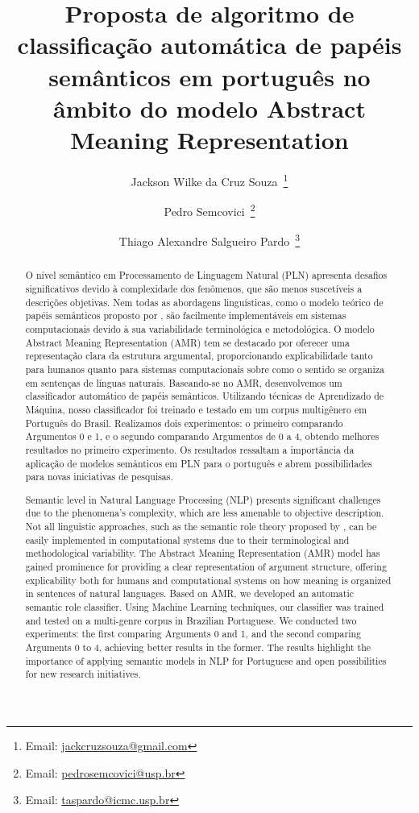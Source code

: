 \documentclass[portuguese]{textolivre}
\title{Proposta de algoritmo de classificação automática de papéis semânticos em português no âmbito do modelo Abstract Meaning Representation}
\author[1]{Jackson Wilke da Cruz Souza~\orcid{0000-0003-1881-6780}\thanks{Email: \href{mailto:jackcruzsouza@gmail.com}{jackcruzsouza@gmail.com}}}
\author[2]{Pedro Semcovici~\orcid{0009-0008-8455-8509 }\thanks{Email: \href{mailto:pedrosemcovici@usp.br}{pedrosemcovici@usp.br}}}
\author[2]{Thiago Alexandre Salgueiro Pardo~\orcid{0000-0003-2111-1319 }\thanks{Email: \href{mailto:taspardo@icmc.usp.br}{taspardo@icmc.usp.br}}}
\affil[1]{Universidade Federal da Bahia,Instituto de Ciência, Tecnologia e Inovação, Camaçari, BA, Brasil.}
\affil[2]{Universidade de São Paulo, Escola de Artes, Ciências e Humanidades, São Paulo, SP, Brasil.}
\begin{document}
\maketitle
\begin{polyabstract}
\begin{abstract}
  O nível semântico em Processamento de Linguagem Natural (PLN) apresenta desafios significativos devido à complexidade dos fenômenos, que são menos suscetíveis a descrições objetivas. Nem todas as abordagens linguísticas, como o modelo teórico de papéis semânticos proposto por \textcite{cançado2017}, são facilmente implementáveis em sistemas computacionais devido à sua variabilidade terminológica e metodológica. O modelo Abstract Meaning Representation (AMR) \cite{banarescu2013,weischedel2013} tem se destacado por oferecer uma representação clara da estrutura argumental, proporcionando explicabilidade tanto para humanos quanto para sistemas computacionais sobre como o sentido se organiza em sentenças de línguas naturais. Baseando-se no AMR, desenvolvemos um classificador automático de papéis semânticos. Utilizando técnicas de Aprendizado de Máquina, nosso classificador foi treinado e testado em um corpus multigênero em Português do Brasil. Realizamos dois experimentos: o primeiro comparando Argumentos 0 e 1, e o segundo comparando Argumentos de 0 a 4, obtendo melhores resultados no primeiro experimento. Os resultados ressaltam a importância da aplicação de modelos semânticos em PLN para o português e abrem possibilidades para novas iniciativas de pesquisas.

  
  

\end{abstract}

\begin{english}
\begin{abstract}
  Semantic level in Natural Language Processing (NLP) presents significant challenges due to the phenomena’s complexity, which are less amenable to objective description. Not all linguistic approaches, such as the semantic role theory proposed by \textcite{cançado2017}, can be easily implemented in computational systems due to their terminological and methodological variability. The Abstract Meaning Representation (AMR) model \cite{banarescu2013,weischedel2013} has gained prominence for providing a clear representation of argument structure, offering explicability both for humans and computational systems on how meaning is organized in sentences of natural languages. Based on AMR, we developed an automatic semantic role classifier. Using Machine Learning techniques, our classifier was trained and tested on a multi-genre corpus in Brazilian Portuguese. We conducted two experiments: the first comparing Arguments 0 and 1, and the second comparing Arguments 0 to 4, achieving better results in the former. The results highlight the importance of applying semantic models in NLP for Portuguese and open possibilities for new research initiatives.
  

\end{abstract}
\end{english}
\end{polyabstract}
\end{document}
